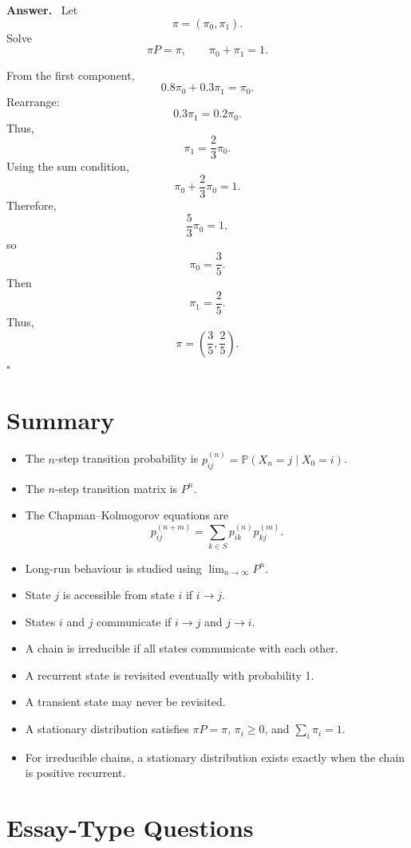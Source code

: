 \documentclass[12pt,a4paper]{article}
\theoremstyle{lecturestyle}
\newenvironment{answer}
{\par\textbf{Answer.}\ }
{\hfill$\square$\par}
\newcommand{\Prob}{\mathbb{P}}
\begin{document}
\begin{answer}
Let
\[
\pi=(\pi_0,\pi_1).
\]
Solve
\[
\pi P=\pi,
\qquad
\pi_0+\pi_1=1.
\]

From the first component,
\[
0.8\pi_0+0.3\pi_1=\pi_0.
\]
Rearrange:
\[
0.3\pi_1=0.2\pi_0.
\]
Thus,
\[
\pi_1=\frac{2}{3}\pi_0.
\]
Using the sum condition,
\[
\pi_0+\frac23\pi_0=1.
\]
Therefore,
\[
\frac53\pi_0=1,
\]
so
\[
\pi_0=\frac35.
\]
Then
\[
\pi_1=\frac25.
\]
Thus,
\[
\boxed{\pi=\left(\frac35,\frac25\right).}
\]
\end{answer}

\section{Summary}

\begin{itemize}[leftmargin=1.2cm]
    \item The $n$-step transition probability is $p_{ij}^{(n)}=\Prob(X_n=j\mid X_0=i)$.
    \item The $n$-step transition matrix is $P^n$.
    \item The Chapman--Kolmogorov equations are
    \[
    p_{ij}^{(n+m)}=\sum_{k\in S}p_{ik}^{(n)}p_{kj}^{(m)}.
    \]
    \item Long-run behaviour is studied using $\lim_{n\to\infty}P^n$.
    \item State $j$ is accessible from state $i$ if $i\to j$.
    \item States $i$ and $j$ communicate if $i\to j$ and $j\to i$.
    \item A chain is irreducible if all states communicate with each other.
    \item A recurrent state is revisited eventually with probability 1.
    \item A transient state may never be revisited.
    \item A stationary distribution satisfies $\pi P=\pi$, $\pi_i\geq 0$, and $\sum_i\pi_i=1$.
    \item For irreducible chains, a stationary distribution exists exactly when the chain is positive recurrent.
\end{itemize}

\section{Essay-Type Questions}
\end{document}
